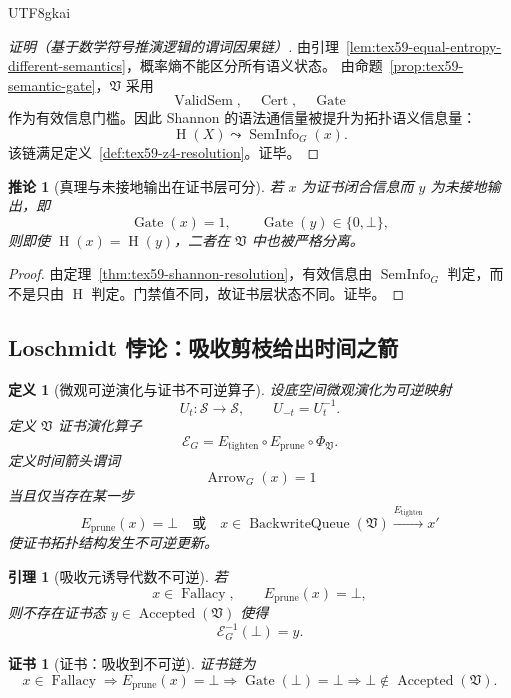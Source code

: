 \documentclass[12pt]{article}
\newtheorem{definition}{定义}[section]
\newtheorem{corollary}{推论}[section]
\newtheorem{lemma}{引理}[section]
\newtheorem{Certificate}{证书}[section]
\newcommand{\Vsys}{\mathfrak V}
\newcommand{\Scal}{\mathcal{S}}
\DeclareMathOperator{\Cert}{Cert}
\DeclareMathOperator{\Accepted}{Accepted}
\DeclareMathOperator{\Fallacy}{Fallacy}
\DeclareMathOperator{\Gate}{Gate}
\DeclareMathOperator{\BackwriteQueue}{BackwriteQueue}
\DeclareMathOperator{\ValidSem}{ValidSem}
\DeclareMathOperator{\Entropy}{H}
\DeclareMathOperator{\SemInfo}{SemInfo}
\DeclareMathOperator{\Arrow}{Arrow}
\begin{document}
\begin{CJK*}{UTF8}{gkai}
\begin{proof}[证明（基于数学符号推演逻辑的谓词因果链）]
由引理~\ref{lem:tex59-equal-entropy-different-semantics}，概率熵不能区分所有语义状态。
由命题~\ref{prop:tex59-semantic-gate}，\(\Vsys\) 采用
\[
  \ValidSem,\quad \Cert,\quad \Gate
\]
作为有效信息门槛。因此 Shannon 的语法通信量被提升为拓扑语义信息量：
\[
  \Entropy(X)
  \leadsto
  \SemInfo_G(x).
\]
该链满足定义~\ref{def:tex59-z4-resolution}。证毕。
\end{proof}

\begin{corollary}[真理与未接地输出在证书层可分]
\label{cor:tex59-truth-ungrounded-separated}
若 \(x\) 为证书闭合信息而 \(y\) 为未接地输出，即
\[
  \Gate(x)=1,\qquad \Gate(y)\in\{0,\bot\},
\]
则即使 \(\Entropy(x)=\Entropy(y)\)，二者在 \(\Vsys\) 中也被严格分离。
\end{corollary}

\begin{proof}
由定理~\ref{thm:tex59-shannon-resolution}，有效信息由 \(\SemInfo_G\) 判定，而不是只由
\(\Entropy\) 判定。门禁值不同，故证书层状态不同。证毕。
\end{proof}

\subsection{Loschmidt 悖论：吸收剪枝给出时间之箭}
\label{subsec:tex59-loschmidt-arrow}

\begin{definition}[微观可逆演化与证书不可逆算子]
\label{def:tex59-arrow-operator}
设底空间微观演化为可逆映射
\[
  U_t:\Scal\to\Scal,
  \qquad
  U_{-t}=U_t^{-1}.
\]
定义 \(\Vsys\) 证书演化算子
\[
  \mathcal E_G
  =
  E_{\mathrm{tighten}}\circ E_{\mathrm{prune}}\circ \Phi_{\Vsys}.
\]
定义时间箭头谓词
\[
  \Arrow_G(x)=1
\]
当且仅当存在某一步
\[
  E_{\mathrm{prune}}(x)=\bot
  \quad\text{或}\quad
  x\in\BackwriteQueue(\Vsys)
  \xrightarrow{E_{\mathrm{tighten}}}
  x'
\]
使证书拓扑结构发生不可逆更新。
\end{definition}

\begin{lemma}[吸收元诱导代数不可逆]
\label{lem:tex59-bottom-irreversible}
若
\[
  x\in\Fallacy,
  \qquad
  E_{\mathrm{prune}}(x)=\bot,
\]
则不存在证书态 \(y\in\Accepted(\Vsys)\) 使得
\[
  \mathcal E_G^{-1}(\bot)=y.
\]
\end{lemma}

\begin{Certificate}[证书：吸收到不可逆]
\label{cert:tex59-bottom-irreversible}
证书链为
\[
  x\in\Fallacy
  \Longrightarrow
  E_{\mathrm{prune}}(x)=\bot
  \Longrightarrow
  \Gate(\bot)=\bot
  \Longrightarrow
  \bot\notin\Accepted(\Vsys).
\]
\end{Certificate}


\end{CJK*}
\end{document}
